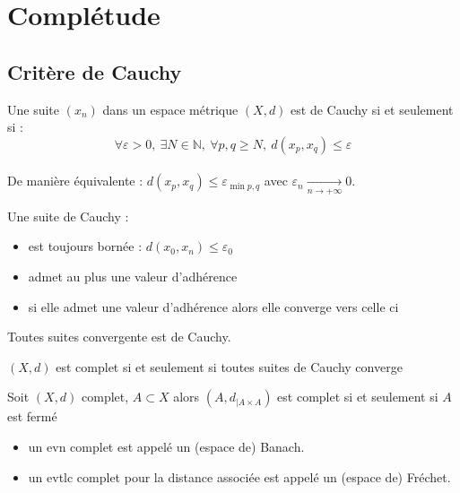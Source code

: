 \section{Complétude}
\subsection{Critère de Cauchy}

\begin{definition}
Une suite $(x_{n})$ dans un espace métrique $(X,d)$ est de Cauchy si et seulement si :
$$\forall \varepsilon >0,\ \exists N\in \mathbb{N} ,\ \forall p,q\ge N,\ d(x_p,x_q)\le \varepsilon $$\\
De manière équivalente : $d(x_p,x_q)\le \varepsilon _{\min p,q}$ avec $\varepsilon _n \underset{n\to +\infty}{\longrightarrow} 0$.\\

\end{definition}

Une suite de Cauchy :
\begin{itemize}
    \item est toujours bornée : $d(x_0,x_n)\le \varepsilon _0$
    \item admet au plus une valeur d'adhérence
    \item si elle admet une valeur d'adhérence alors elle converge vers celle ci
\end{itemize}
Toutes suites convergente est de Cauchy.

\begin{definition}
    $(X,d)$ est complet si et seulement si toutes suites de Cauchy converge
\end{definition}
\begin{lemme}
    Soit $(X,d)$ complet, $A \subset X$ alors $(A,d_{|A\times A})$ est complet si et seulement si $A$ est fermé
\end{lemme}


\begin{remarque}\par\noindent
\begin{itemize}
    \item un evn complet est appelé un (espace de) Banach. \\
    
    \item un evtlc complet pour la distance associée est appelé un (espace de) Fréchet.
\end{itemize}
\end{remarque}

